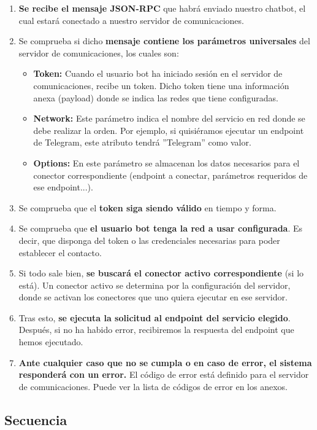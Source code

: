 \documentclass[spanish,12pt, a4paper, twoside]{paper}
\begin{document}
\begin{enumerate}
\item\textbf{Se recibe el mensaje JSON-RPC} que habrá enviado nuestro chatbot, el cual estará conectado a nuestro servidor de comunicaciones.
\item Se comprueba si dicho \textbf{mensaje contiene los parámetros universales} del servidor de comunicaciones, los cuales son:
\begin{itemize}
\item\textbf{Token:} Cuando el usuario bot ha iniciado sesión en el servidor de comunicaciones, recibe un token. Dicho token tiene una información anexa (payload) donde se indica las redes que tiene configuradas.
\item\textbf{Network:} Este parámetro indica el nombre del servicio en red donde se debe realizar la orden. Por ejemplo, si quisiéramos ejecutar un endpoint de Telegram, este atributo tendrá ''Telegram'' como valor.
\item\textbf{Options:} En este parámetro se almacenan los datos necesarios para el conector correspondiente (endpoint a conectar, parámetros requeridos de ese endpoint...).
\end{itemize}
\item Se comprueba que el \textbf{token siga siendo válido} en tiempo y forma.
\item Se comprueba que \textbf{el usuario bot tenga la red a usar configurada}. Es decir, que disponga del token o las credenciales necesarias para poder establecer el contacto.
\item Si todo sale bien, \textbf{se buscará el conector activo correspondiente }(si lo está). Un conector activo se determina por la configuración del servidor, donde se activan los conectores que uno quiera ejecutar en ese servidor.
\item Tras esto, \textbf{se ejecuta la solicitud al endpoint del servicio elegido}. Después, si no ha habido error, recibiremos la respuesta del endpoint que hemos ejecutado.
\item \textbf{Ante cualquier caso que no se cumpla o en caso de error, el sistema responderá con un error.} El código de error está definido para el servidor de comunicaciones. Puede ver la lista de códigos de error en los anexos.
\end{enumerate}

\subsection{Secuencia}
\end{document}
